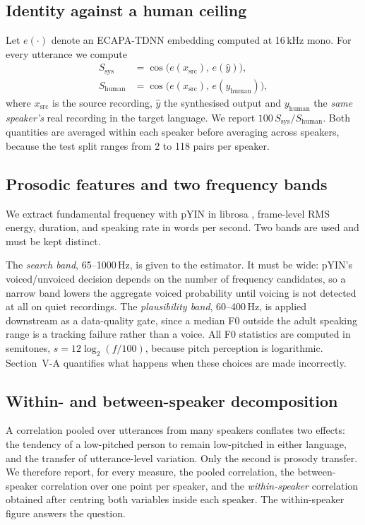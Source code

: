 \documentclass[journal]{IEEEtran}
\begin{document}
\subsection{Identity against a human ceiling}
Let $e(\cdot)$ denote an ECAPA-TDNN embedding \cite{desplanques2020ecapa} computed at 16\,kHz mono.
For every utterance we compute
\begin{align}
S_{\text{sys}}   &= \cos\!\big(e(x_{\text{src}}),\, e(\hat{y})\big), \label{eq:ssys}\\
S_{\text{human}} &= \cos\!\big(e(x_{\text{src}}),\, e(y_{\text{human}})\big), \label{eq:shum}
\end{align}
where $x_{\text{src}}$ is the source recording, $\hat{y}$ the synthesised output and
$y_{\text{human}}$ the \emph{same speaker's} real recording in the target language. We report
$100\,S_{\text{sys}}/S_{\text{human}}$. Both quantities are averaged within each speaker before
averaging across speakers, because the test split ranges from 2 to 118 pairs per speaker.

\subsection{Prosodic features and two frequency bands}
\label{sec:bands}
We extract fundamental frequency with pYIN \cite{mauch2014pyin} in librosa \cite{mcfee2015librosa},
frame-level RMS energy, duration, and speaking rate in words per second. Two bands are used and
must be kept distinct.

The \emph{search band}, 65--1000\,Hz, is given to the estimator. It must be wide: pYIN's
voiced/unvoiced decision depends on the number of frequency candidates, so a narrow band lowers the
aggregate voiced probability until voicing is not detected at all on quiet recordings. The
\emph{plausibility band}, 60--400\,Hz, is applied downstream as a data-quality gate, since a median
F0 outside the adult speaking range is a tracking failure rather than a voice. All F0 statistics are
computed in semitones, $s = 12\log_2 (f/100)$, because pitch perception is logarithmic. Section~V-A
quantifies what happens when these choices are made incorrectly.

\subsection{Within- and between-speaker decomposition}
A correlation pooled over utterances from many speakers conflates two effects: the tendency of a
low-pitched person to remain low-pitched in either language, and the transfer of utterance-level
variation. Only the second is prosody transfer. We therefore report, for every measure, the pooled
correlation, the between-speaker correlation over one point per speaker, and the
\emph{within-speaker} correlation obtained after centring both variables inside each speaker. The
within-speaker figure answers the question.
\end{document}
